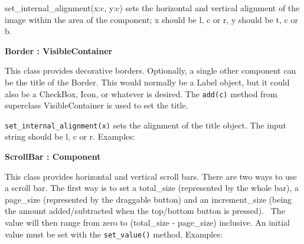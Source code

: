 set\_internal\_alignment(x:{\textquotedbl}c{\textquotedbl},
y:{\textquotedbl}c{\textquotedbl}) sets the horizontal and vertical
alignment of the image within the area of the component; x should be
{\textquotedbl}l{\textquotedbl}, {\textquotedbl}c{\textquotedbl} or
{\textquotedbl}r{\textquotedbl}, y should be
{\textquotedbl}t{\textquotedbl}, {\textquotedbl}c{\textquotedbl} or
{\textquotedbl}b{\textquotedbl}.

{\ttfamily\bfseries
{}Border : VisibleContainer}

This class provides decorative borders. Optionally, a single other
component can be the title of the Border. This would normally be a
Label object, but it could also be a CheckBox, Icon, or whatever is
desired. The \texttt{add(c)} method from superclass VisibleContainer is used to
set the title.

\texttt{set\_internal\_alignment(x)} sets the alignment of the title object. The
input string should be {\textquotedbl}l{\textquotedbl},
{\textquotedbl}c{\textquotedbl} or {\textquotedbl}r{\textquotedbl}.
Examples:


{\ttfamily\bfseries
{}ScrollBar : Component}

This class provides horizontal and vertical scroll bars. There are two
ways to use a scroll bar. The first way is to set a total\_size
(represented by the whole bar), a page\_size (represented by the
draggable button) and an increment\_size (being the amount
added/subtracted when the top/bottom button is pressed). \ The value
will then range from zero to (total\_size - page\_size) inclusive. An
initial value must be set with the \texttt{set\_value()} method. Examples:


